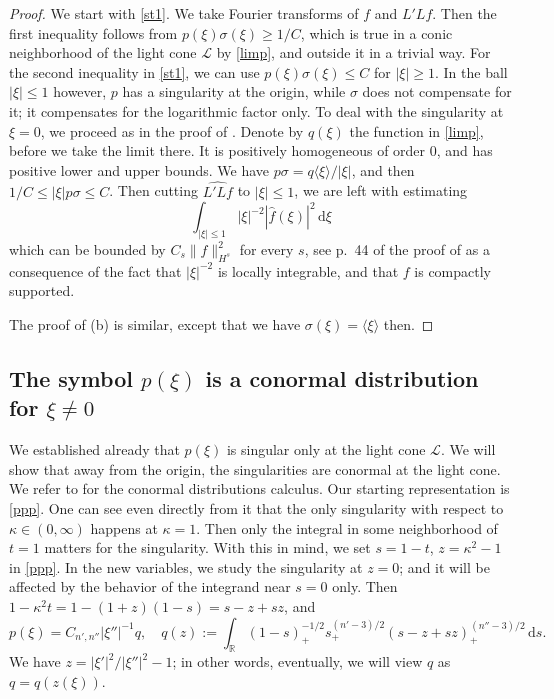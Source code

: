 \documentclass[11pt]{amsart}
\theoremstyle{definition}
\theoremstyle{remark}
\numberwithin{equation}{section}
\newcommand{\rb}{\mathbb{R}}
\renewcommand{\d}{\,\mathrm{d}}
\begin{document}
\begin{proof}
We start with \eqref{st1}. 	We take Fourier transforms of $f$ and $L'Lf$. Then the first inequality follows from $p(\xi)\sigma(\xi)\ge 1/C$, which is true in a conic neighborhood of the light cone $\mathcal L$ by \eqref{limp}, and outside it in a trivial way. For the second inequality in \eqref{st1},  we can use   $p(\xi)\sigma(\xi)\le C$ for $|\xi|\ge1$. In the ball $|\xi|\le 1$ however, $p$ has a singularity at the origin, while $\sigma$ does not compensate for it; it compensates for the logarithmic factor only. To deal with the singularity at $\xi=0$, we proceed as in the proof of \cite[Theorem~II.5.1]{Natterer-book}. Denote by $q(\xi)$ the function in \eqref{limp}, before we take the limit there. It is positively homogeneous of order $0$, and has positive lower and upper bounds. We have $p\sigma = q \langle\xi\rangle/|\xi|$, and then $1/C \le |\xi|p\sigma\le C$. Then cutting $\widehat{L'Lf}$ to $|\xi|\le1$, we are left with estimating
\[
\int_{|\xi|\le 1} |\xi|^{-2} |\hat f(\xi)|^2\d \xi
\]
which can be bounded by $C_s\|f\|^2_{H^s}$ for every $s$, see p.~44 of the proof of  \cite[Theorem~II.5.1]{Natterer-book}   as a consequence of the fact that $|\xi|^{-2}$ is locally integrable, and that $f$ is compactly supported. 

The proof of (b) is similar, except that we have $\sigma(\xi) = \langle \xi\rangle$ then. 
\end{proof}




\subsection{The symbol $p(\xi)$ is a conormal distribution for $\xi\not=0$} \label{sec_co}
We established already that $p(\xi)$ is singular only at the light cone $\mathcal L$. 
We will show that away from the origin, the singularities are conormal at the light cone. We refer to  \cite[sec.~18.2]{Hormander3} for the conormal distributions calculus.   Our starting representation is \eqref{ppp}. One can see even directly from it that the only singularity with respect to $\kappa\in (0,\infty)$   happens at $\kappa=1$. Then only the integral in some neighborhood of $t=1$ matters for the singularity. With this in mind, we set $s=1-t$, $z = \kappa^{2}-1$ in \eqref{ppp}. In the new variables, we study the singularity at $z=0$; and it will be affected by the behavior of the integrand near $s=0$ only.    Then $1-\kappa^{2} t = 1- (1+z)(1-s) = s-z +sz $, and 
\begin{equation}\label{q}
p(\xi) = C_{n',n''} |\xi''|^{-1}q,\quad q(z) := \int_{\rb} (1-s)_+^{-1/2} s_+^{(n'-3)/2} (s-z +sz)_+^{(n''-3)/2} \d s .
\end{equation}
We have $z=|\xi'|^2/|\xi''|^2-1$; in other words, eventually, we will view $q$ as $q=q(z(\xi))$. 
\end{document}
